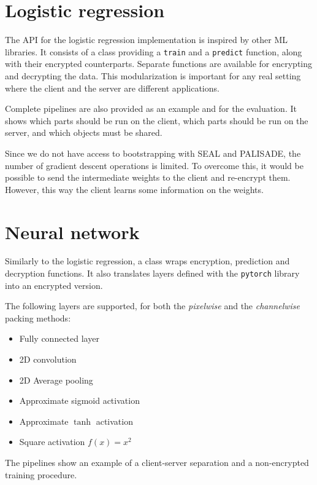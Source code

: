 \documentclass[a4paper,11pt,oneside]{report}
\begin{document}
\section{Logistic regression}

The API for the logistic regression implementation is inspired by other ML libraries. 
It consists of a class providing a \texttt{train} and a \texttt{predict} function, along with their encrypted counterparts. 
Separate functions are available for encrypting and decrypting the data. 
This modularization is important for any real setting where the client and the server are different applications.

Complete pipelines are also provided as an example and for the evaluation.
It shows which parts should be run on the client, which parts should be run on the server, and which objects must be shared.

Since we do not have access to bootstrapping with SEAL and PALISADE, the number of gradient descent operations is limited. 
To overcome this, it would be possible to send the intermediate weights to the client and re-encrypt them. 
However, this way the client learns some information on the weights.

\section{Neural network}

Similarly to the logistic regression, a class wraps encryption, prediction and decryption functions. 
It also translates layers defined with the \texttt{pytorch} library into an encrypted version.

The following layers are supported, for both the \emph{pixelwise} and the \emph{channelwise} packing methods:
\begin{itemize}
  \item Fully connected layer
  \item 2D convolution
  \item 2D Average pooling
  \item Approximate sigmoid activation
  \item Approximate $\tanh$ activation
  \item Square activation $f(x) = x^2$
\end{itemize}

The pipelines show an example of a client-server separation and a non-encrypted training procedure.
\end{document}
